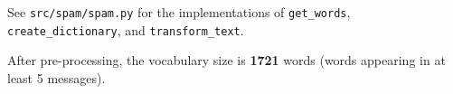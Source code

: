 \begin{answer}
See \texttt{src/spam/spam.py} for the implementations of \texttt{get\_words}, \texttt{create\_dictionary}, and \texttt{transform\_text}.

After pre-processing, the vocabulary size is \textbf{1721} words (words appearing in at least 5 messages).
\end{answer}
